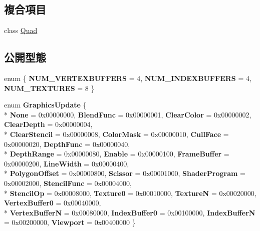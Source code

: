 \subsection*{複合項目}
\begin{DoxyCompactItemize}
\item 
class \hyperlink{class_magnum_1_1_g_x_context_1_1_quad}{Quad}
\end{DoxyCompactItemize}
\subsection*{公開型態}
\begin{DoxyCompactItemize}
\item 
enum \{ {\bfseries N\+U\+M\+\_\+\+V\+E\+R\+T\+E\+X\+B\+U\+F\+F\+E\+RS} = 4, 
{\bfseries N\+U\+M\+\_\+\+I\+N\+D\+E\+X\+B\+U\+F\+F\+E\+RS} = 4, 
{\bfseries N\+U\+M\+\_\+\+T\+E\+X\+T\+U\+R\+ES} = 8
 \}\hypertarget{class_magnum_1_1_g_x_context_ac4300d1ef845efa0bc0f0e4ad5473e9d}{}\label{class_magnum_1_1_g_x_context_ac4300d1ef845efa0bc0f0e4ad5473e9d}

\item 
enum {\bfseries Graphics\+Update} \{ \\*
{\bfseries None} = 0x00000000, 
{\bfseries Blend\+Func} = 0x00000001, 
{\bfseries Clear\+Color} = 0x00000002, 
{\bfseries Clear\+Depth} = 0x00000004, 
\\*
{\bfseries Clear\+Stencil} = 0x00000008, 
{\bfseries Color\+Mask} = 0x00000010, 
{\bfseries Cull\+Face} = 0x00000020, 
{\bfseries Depth\+Func} = 0x00000040, 
\\*
{\bfseries Depth\+Range} = 0x00000080, 
{\bfseries Enable} = 0x00000100, 
{\bfseries Frame\+Buffer} = 0x00000200, 
{\bfseries Line\+Width} = 0x00000400, 
\\*
{\bfseries Polygon\+Offset} = 0x00000800, 
{\bfseries Scissor} = 0x00001000, 
{\bfseries Shader\+Program} = 0x00002000, 
{\bfseries Stencil\+Func} = 0x00004000, 
\\*
{\bfseries Stencil\+Op} = 0x00008000, 
{\bfseries Texture0} = 0x00010000, 
{\bfseries TextureN} = 0x00020000, 
{\bfseries Vertex\+Buffer0} = 0x00040000, 
\\*
{\bfseries Vertex\+BufferN} = 0x00080000, 
{\bfseries Index\+Buffer0} = 0x00100000, 
{\bfseries Index\+BufferN} = 0x00200000, 
{\bfseries Viewport} = 0x00400000
 \}\hypertarget{class_magnum_1_1_g_x_context_aff8f4b8f30d1af0adc3ea133cf0d4bb8}{}\label{class_magnum_1_1_g_x_context_aff8f4b8f30d1af0adc3ea133cf0d4bb8}

\end{DoxyCompactItemize}
